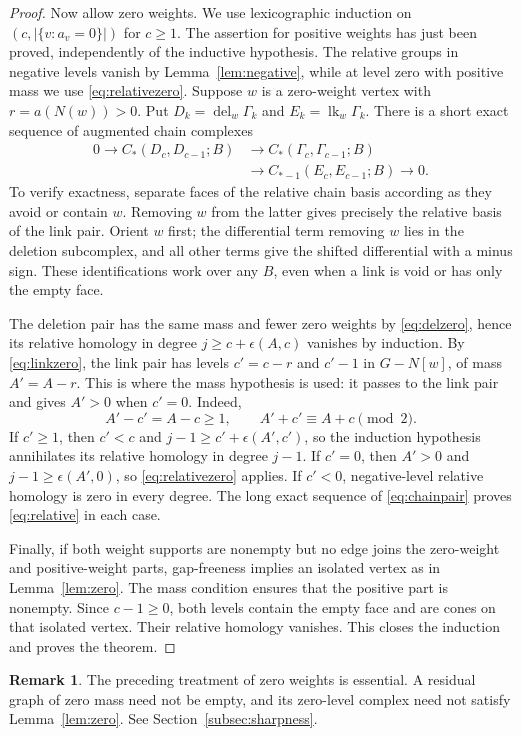 \documentclass[11pt,a4paper]{article}
\theoremstyle{definition}
\newtheorem{remark}[theorem]{Remark}
\newcommand{\lk}{\operatorname{lk}}
\newcommand{\del}{\operatorname{del}}
\newcommand{\G}{\Gamma}
\begin{document}
\begin{proof}
Now allow zero weights. We use lexicographic induction on $(c,|\{v:a_v=0\}|)$ for $c\geq1$. The assertion for positive weights has just been proved, independently of the inductive hypothesis. The relative groups in negative levels vanish by Lemma~\ref{lem:negative}, while at level zero with positive mass we use \eqref{eq:relativezero}. Suppose $w$ is a zero-weight vertex with $r=a(N(w))>0$. Put $D_k=\del_w\G_k$ and $E_k=\lk_w\G_k$. There is a short exact sequence of augmented chain complexes
\begin{equation}\label{eq:chainpair}
 \begin{split}
 0\longrightarrow C_*(D_c,D_{c-1};B)&\longrightarrow C_*(\G_c,\G_{c-1};B)\\
 &\longrightarrow C_{*-1}(E_c,E_{c-1};B)\longrightarrow0.
 \end{split}
\end{equation}
To verify exactness, separate faces of the relative chain basis according as they avoid or contain $w$. Removing $w$ from the latter gives precisely the relative basis of the link pair. Orient $w$ first; the differential term removing $w$ lies in the deletion subcomplex, and all other terms give the shifted differential with a minus sign. These identifications work over any $B$, even when a link is void or has only the empty face.

The deletion pair has the same mass and fewer zero weights by \eqref{eq:delzero}, hence its relative homology in degree $j\geq c+\epsilon(A,c)$ vanishes by induction. By \eqref{eq:linkzero}, the link pair has levels $c'=c-r$ and $c'-1$ in $G-N[w]$, of mass $A'=A-r$. This is where the mass hypothesis is used: it passes to the link pair and gives $A'>0$ when $c'=0$. Indeed,
\[
 A'-c'=A-c\geq1,\qquad A'+c'\equiv A+c\pmod2.
\]
If $c'\geq1$, then $c'<c$ and $j-1\geq c'+\epsilon(A',c')$, so the induction hypothesis annihilates its relative homology in degree $j-1$. If $c'=0$, then $A'>0$ and $j-1\geq\epsilon(A',0)$, so \eqref{eq:relativezero} applies. If $c'<0$, negative-level relative homology is zero in every degree. The long exact sequence of \eqref{eq:chainpair} proves \eqref{eq:relative} in each case.

Finally, if both weight supports are nonempty but no edge joins the zero-weight and positive-weight parts, gap-freeness implies an isolated vertex as in Lemma~\ref{lem:zero}. The mass condition ensures that the positive part is nonempty. Since $c-1\geq0$, both levels contain the empty face and are cones on that isolated vertex. Their relative homology vanishes. This closes the induction and proves the theorem.
\end{proof}
\begin{remark}\label{rem:masszero}
The preceding treatment of zero weights is essential. A residual graph of zero mass need not be empty, and its zero-level complex need not satisfy Lemma~\ref{lem:zero}. See Section~\ref{subsec:sharpness}.
\end{remark}
\end{document}
